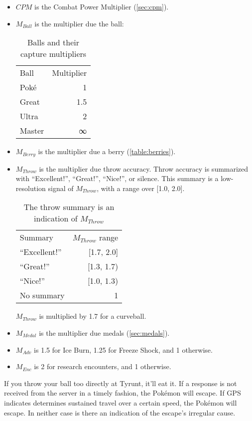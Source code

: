 \begin{itemize}
  \item $CPM$ is the Combat Power Multiplier (\autoref{sec:cpm}).
  \item $M_{Ball}$ is the multiplier due the ball:
\begin{table}[h!]
\centering
\begin{tabular}{lr}
Ball & Multiplier\\
\Midrule
Poké & 1\\
Great & 1.5\\
Ultra & 2\\
Master & ∞\\
\end{tabular}
  \caption{Balls and their capture multipliers\label{table:balls}}
\end{table}
\item $M_{Berry}$ is the multiplier due a berry (\autoref{table:berries}).
\item $M_{Throw}$ is the multiplier due throw accuracy. Throw accuracy is summarized
   with ``Excellent!'', ``Great!'', ``Nice!'', or silence.
    This summary is a low-resolution signal of $M_{Throw}$, with a range over [1.0, 2.0].
\begin{table}[h!]
\centering
\begin{tabular}{lr}
Summary & $M_{Throw}$ range\\
\Midrule
``Excellent!'' & [1.7, 2.0]\\
``Great!'' & [1.3, 1.7)\\
``Nice!'' & [1.0, 1.3)\\
No summary & 1\\
\end{tabular}
  \caption{The throw summary is an indication of $M_{Throw}$\label{table:throw}}
\end{table}
$M_{Throw}$ is multiplied by 1.7 for a curveball.
\item $M_{Medal}$ is the multiplier due medals (\autoref{sec:medals}).
\item $M_{Adv}$ is 1.5 for Ice Burn, 1.25 for Freeze Shock, and 1 otherwise.
\item $M_{Enc}$ is 2 for research encounters, and 1 otherwise.
\end{itemize}
If you throw your ball too directly at Tyrunt, it'll eat it.
If a response is not received from the server in a timely fashion, the Pokémon will escape.
If GPS indicates determines sustained travel over a certain speed, the Pokémon will escape.
In neither case is there an indication of the escape's irregular cause.

